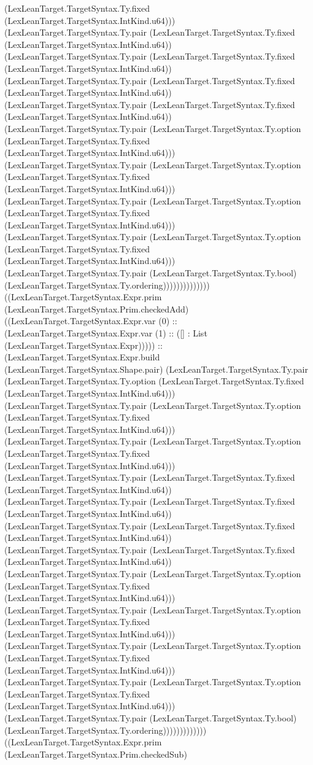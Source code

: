 \documentclass[11pt]{article}
\begin{document}
(LexLeanTarget.TargetSyntax.Ty.fixed (LexLeanTarget.TargetSyntax.IntKind.u64))) (LexLeanTarget.TargetSyntax.Ty.pair (LexLeanTarget.TargetSyntax.Ty.fixed (LexLeanTarget.TargetSyntax.IntKind.u64)) (LexLeanTarget.TargetSyntax.Ty.pair (LexLeanTarget.TargetSyntax.Ty.fixed (LexLeanTarget.TargetSyntax.IntKind.u64)) (LexLeanTarget.TargetSyntax.Ty.pair (LexLeanTarget.TargetSyntax.Ty.fixed (LexLeanTarget.TargetSyntax.IntKind.u64)) (LexLeanTarget.TargetSyntax.Ty.pair (LexLeanTarget.TargetSyntax.Ty.fixed (LexLeanTarget.TargetSyntax.IntKind.u64)) (LexLeanTarget.TargetSyntax.Ty.pair (LexLeanTarget.TargetSyntax.Ty.option (LexLeanTarget.TargetSyntax.Ty.fixed (LexLeanTarget.TargetSyntax.IntKind.u64))) (LexLeanTarget.TargetSyntax.Ty.pair (LexLeanTarget.TargetSyntax.Ty.option (LexLeanTarget.TargetSyntax.Ty.fixed (LexLeanTarget.TargetSyntax.IntKind.u64))) (LexLeanTarget.TargetSyntax.Ty.pair (LexLeanTarget.TargetSyntax.Ty.option (LexLeanTarget.TargetSyntax.Ty.fixed (LexLeanTarget.TargetSyntax.IntKind.u64))) (LexLeanTarget.TargetSyntax.Ty.pair (LexLeanTarget.TargetSyntax.Ty.option (LexLeanTarget.TargetSyntax.Ty.fixed (LexLeanTarget.TargetSyntax.IntKind.u64))) (LexLeanTarget.TargetSyntax.Ty.pair (LexLeanTarget.TargetSyntax.Ty.bool) (LexLeanTarget.TargetSyntax.Ty.ordering)))))))))))))) ((LexLeanTarget.TargetSyntax.Expr.prim (LexLeanTarget.TargetSyntax.Prim.checkedAdd) ((LexLeanTarget.TargetSyntax.Expr.var (0) :: (LexLeanTarget.TargetSyntax.Expr.var (1) :: ([] : List (LexLeanTarget.TargetSyntax.Expr))))) :: (LexLeanTarget.TargetSyntax.Expr.build (LexLeanTarget.TargetSyntax.Shape.pair) (LexLeanTarget.TargetSyntax.Ty.pair (LexLeanTarget.TargetSyntax.Ty.option (LexLeanTarget.TargetSyntax.Ty.fixed (LexLeanTarget.TargetSyntax.IntKind.u64))) (LexLeanTarget.TargetSyntax.Ty.pair (LexLeanTarget.TargetSyntax.Ty.option (LexLeanTarget.TargetSyntax.Ty.fixed (LexLeanTarget.TargetSyntax.IntKind.u64))) (LexLeanTarget.TargetSyntax.Ty.pair (LexLeanTarget.TargetSyntax.Ty.option (LexLeanTarget.TargetSyntax.Ty.fixed (LexLeanTarget.TargetSyntax.IntKind.u64))) (LexLeanTarget.TargetSyntax.Ty.pair (LexLeanTarget.TargetSyntax.Ty.fixed (LexLeanTarget.TargetSyntax.IntKind.u64)) (LexLeanTarget.TargetSyntax.Ty.pair (LexLeanTarget.TargetSyntax.Ty.fixed (LexLeanTarget.TargetSyntax.IntKind.u64)) (LexLeanTarget.TargetSyntax.Ty.pair (LexLeanTarget.TargetSyntax.Ty.fixed (LexLeanTarget.TargetSyntax.IntKind.u64)) (LexLeanTarget.TargetSyntax.Ty.pair (LexLeanTarget.TargetSyntax.Ty.fixed (LexLeanTarget.TargetSyntax.IntKind.u64)) (LexLeanTarget.TargetSyntax.Ty.pair (LexLeanTarget.TargetSyntax.Ty.option (LexLeanTarget.TargetSyntax.Ty.fixed (LexLeanTarget.TargetSyntax.IntKind.u64))) (LexLeanTarget.TargetSyntax.Ty.pair (LexLeanTarget.TargetSyntax.Ty.option (LexLeanTarget.TargetSyntax.Ty.fixed (LexLeanTarget.TargetSyntax.IntKind.u64))) (LexLeanTarget.TargetSyntax.Ty.pair (LexLeanTarget.TargetSyntax.Ty.option (LexLeanTarget.TargetSyntax.Ty.fixed (LexLeanTarget.TargetSyntax.IntKind.u64))) (LexLeanTarget.TargetSyntax.Ty.pair (LexLeanTarget.TargetSyntax.Ty.option (LexLeanTarget.TargetSyntax.Ty.fixed (LexLeanTarget.TargetSyntax.IntKind.u64))) (LexLeanTarget.TargetSyntax.Ty.pair (LexLeanTarget.TargetSyntax.Ty.bool) (LexLeanTarget.TargetSyntax.Ty.ordering))))))))))))) ((LexLeanTarget.TargetSyntax.Expr.prim (LexLeanTarget.TargetSyntax.Prim.checkedSub) 
\end{document}
